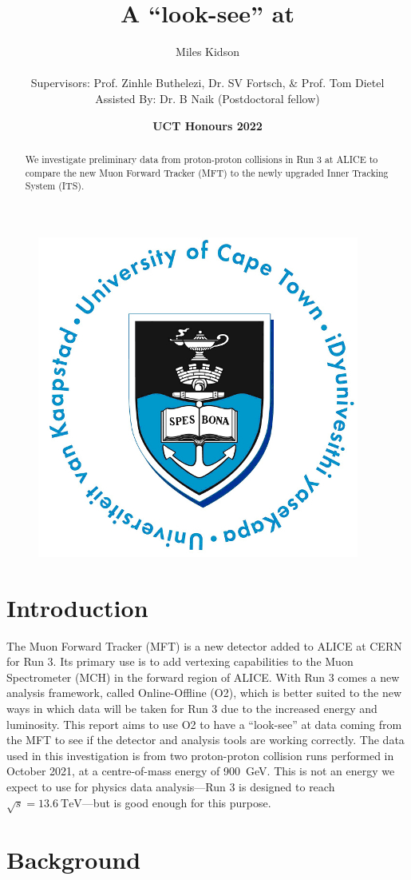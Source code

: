 \documentclass[11pt]{article}
\title{{\Huge A ``look-see'' at }}
\author{{\Large Miles Kidson}\\ \\
Supervisors: Prof. Zinhle Buthelezi, Dr. SV Fortsch, \& Prof. Tom Dietel\\
Assisted By: Dr. B Naik (Postdoctoral fellow)}
\date{\textbf{UCT Honours 2022}}
\numberwithin{equation}{section}
\numberwithin{figure}{section}
\numberwithin{table}{section}
\begin{document}
    
\maketitle

\begin{figure}[h]
    \begin{center}
        \includegraphics{Figs/UCT.jpg}
    \end{center}
\end{figure}

\begin{abstract}
    \centering
    We investigate preliminary data from proton-proton collisions in Run 3 at ALICE to compare the new Muon Forward Tracker (MFT) to the newly upgraded Inner Tracking System (ITS).
\end{abstract}

\newpage
\tableofcontents

\newpage
\section{Introduction}\label{sec:Introduction}
The Muon Forward Tracker (MFT) is a new detector added to ALICE at CERN for Run 3. Its primary use is to add vertexing capabilities to the Muon Spectrometer (MCH) in the forward region of ALICE. With Run 3 comes a new analysis framework, called Online-Offline (O2), which is better suited to the new ways in which data will be taken for Run 3 due to the increased energy and luminosity. This report aims to use O2 to have a ``look-see'' at data coming from the MFT to see if the detector and analysis tools are working correctly. The data used in this investigation is from two proton-proton collision runs performed in October 2021, at a centre-of-mass energy of \SI{900}{\giga\electronvolt}. This is not an energy we expect to use for physics data analysis---Run 3 is designed to reach $\sqrt{s}=\SI{13.6}{\tera\electronvolt}$---but is good enough for this purpose.

\section{Background}\label{sec:Background}



\printbibliography
\end{document}
